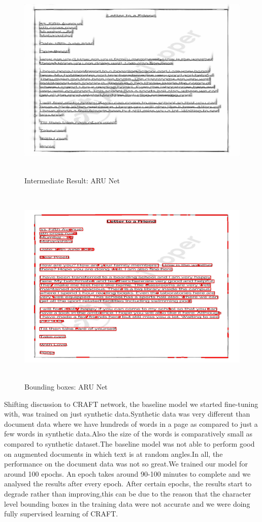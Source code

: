 \begin{figure}[H]
	\includegraphics[width=475pt,height=275pt]{res.jpg}
	\caption{Intermediate Result: ARU Net}
\end{figure}


\begin{figure}[H]
	\includegraphics[width=475pt,height=275pt]{res_boxes.jpg}
	\caption{Bounding boxes: ARU Net}
\end{figure}

Shifting discussion to CRAFT network, the baseline model we started fine-tuning with, was trained on just synthetic data.Synthetic data was very different than document data where we have hundreds of words in a page as compared to just a few words in synthetic data.Also the size of the words is comparatively small as compared to synthetic dataset.The baseline model was not able to perform good on augmented documents in which text is at random angles.In all, the performance on the document data was not so great.We trained our model for around 100 epochs. An epoch takes around 90-100 minutes to complete and we analysed the results after every epoch. After certain epochs, the results start to degrade rather than improving,this can be due to the reason that the character level bounding boxes in the training data were not accurate and we were doing fully supervised learning of CRAFT.

